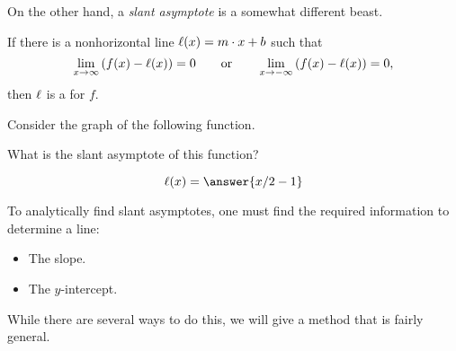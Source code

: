 \documentclass{ximera}
\begin{document}
On the other hand, a \textit{slant asymptote} is a somewhat different
beast.

\begin{definition}
  If there is a nonhorizontal line $\ell(x) = m\cdot x+b$ such that
  \[
  \lim_{x\to \infty}\left(f(x) - \ell(x)\right) = 0 \qquad\text{or}\qquad \lim_{x\to -\infty} \left( f(x) - \ell(x)\right) = 0,
  \]
  then $\ell$ is a  for $f$.
\end{definition}
\begin{question}
  Consider the graph of the following function. 
  \begin{image}
  \end{image}
  What is the slant asymptote of this function?
  \begin{prompt}
    \[
    \l(x) = \answer{x/2 -1}
    \]
  \end{prompt}
\end{question}

To analytically find slant asymptotes, one must find the required
information to determine a line:
\begin{itemize}
\item The slope.
\item The $y$-intercept.
\end{itemize}
While there are several ways to do this, we will give a method that is
fairly general.
\end{document}
